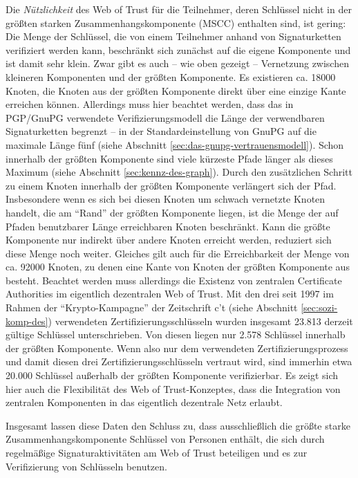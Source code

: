 Die \emph{Nützlichkeit} des Web of Trust für die Teilnehmer, deren
Schlüssel nicht in der größten starken Zusammenhangskomponente
(MSCC)
enthalten sind, ist gering: Die Menge der Schlüssel, die von einem
Teilnehmer anhand von Signaturketten verifiziert werden kann,
beschränkt sich zunächst auf die eigene Komponente und ist damit
sehr klein. Zwar gibt es auch -- wie oben gezeigt -- Vernetzung
zwischen kleineren Komponenten und der größten Komponente. Es
existieren ca. 18000 Knoten, die Knoten aus der größten Komponente
direkt über eine einzige Kante erreichen können. Allerdings muss
hier beachtet werden, dass das in PGP/GnuPG verwendete
Verifizierungsmodell die Länge der verwendbaren Signaturketten
begrenzt -- in der Standardeinstellung von GnuPG auf die maximale
Länge fünf (siehe Abschnitt
\ref{sec:das-gnupg-vertrauensmodell}). Schon innerhalb der größten
Komponente sind viele kürzeste Pfade länger als dieses Maximum
(siehe Abschnitt \ref{sec:kennz-des-graph}). Durch den zusätzlichen
Schritt zu einem Knoten innerhalb der größten Komponente
verlängert sich der Pfad. Insbesondere wenn es sich bei diesen
Knoten um schwach vernetzte Knoten handelt, die am ``Rand'' der
größten Komponente liegen, ist die Menge der auf Pfaden benutzbarer
Länge erreichbaren Knoten beschränkt. Kann die größte
Komponente nur indirekt über andere Knoten erreicht werden,
reduziert sich diese Menge noch weiter. Gleiches gilt auch für die
Erreichbarkeit der Menge von ca. 92000 Knoten, zu denen eine Kante von
Knoten der größten Komponente aus besteht. Beachtet werden muss
allerdings die Existenz von zentralen Certificate Authorities im
eigentlich dezentralen Web of Trust. Mit den drei seit 1997 im Rahmen
der ``Krypto-Kampagne'' der Zeitschrift c't (siehe Abschnitt
\ref{sec:sozi-komp-des}) verwendeten Zertifizierungsschlüsseln
wurden insgesamt 23.813 derzeit gültige Schlüssel
unterschrieben. Von diesen liegen nur 2.578 Schlüssel innerhalb der
größten Komponente. Wenn also nur dem verwendeten
Zertifizierungsprozess und damit diesen drei
Zertifizierungsschlüsseln vertraut wird, sind immerhin etwa 20.000
Schlüssel außerhalb der größten Komponente verifizierbar. Es
zeigt sich hier auch die Flexibilität des Web of Trust-Konzeptes,
dass die Integration von zentralen Komponenten in das eigentlich
dezentrale Netz erlaubt.

Insgesamt lassen diese Daten den Schluss zu, dass ausschließlich die
größte starke Zusammenhangskomponente Schlüssel von Personen
enthält, die sich durch regelmäßige Signaturaktivitäten am Web
of Trust beteiligen und es zur Verifizierung von Schlüsseln
benutzen. 


